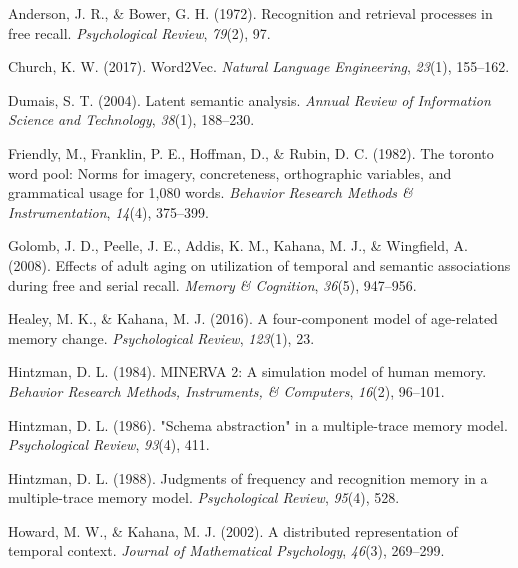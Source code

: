 \documentclass[
  letterpaper,
  DIV=11]{article}
\newlength{\cslhangindent}
\newlength{\cslentryspacingunit} %
\newenvironment{CSLReferences}[2] %
 {%
  \setlength{\parindent}{0pt}
  \ifodd #1
  \let\oldpar\par
  \def\par{\hangindent=\cslhangindent\oldpar}
  \fi
  \setlength{\parskip}{#2\cslentryspacingunit}
 }%
 {}
\begin{document}
\hypertarget{refs}{}
\begin{CSLReferences}{1}{0}
\leavevmode{}%
Anderson, J. R., \& Bower, G. H. (1972). Recognition and retrieval
processes in free recall. \emph{Psychological Review}, \emph{79}(2), 97.

\leavevmode{}%
Church, K. W. (2017). Word2Vec. \emph{Natural Language Engineering},
\emph{23}(1), 155--162.

\leavevmode{}%
Dumais, S. T. (2004). Latent semantic analysis. \emph{Annual Review of
Information Science and Technology}, \emph{38}(1), 188--230.

\leavevmode{}%
Friendly, M., Franklin, P. E., Hoffman, D., \& Rubin, D. C. (1982). The
toronto word pool: Norms for imagery, concreteness, orthographic
variables, and grammatical usage for 1,080 words. \emph{Behavior
Research Methods \& Instrumentation}, \emph{14}(4), 375--399.

\leavevmode{}%
Golomb, J. D., Peelle, J. E., Addis, K. M., Kahana, M. J., \& Wingfield,
A. (2008). Effects of adult aging on utilization of temporal and
semantic associations during free and serial recall. \emph{Memory \&
Cognition}, \emph{36}(5), 947--956.

\leavevmode{}%
Healey, M. K., \& Kahana, M. J. (2016). A four-component model of
age-related memory change. \emph{Psychological Review}, \emph{123}(1),
23.

\leavevmode{}%
Hintzman, D. L. (1984). MINERVA 2: A simulation model of human memory.
\emph{Behavior Research Methods, Instruments, \& Computers},
\emph{16}(2), 96--101.

\leavevmode{}%
Hintzman, D. L. (1986). "Schema abstraction" in a multiple-trace memory
model. \emph{Psychological Review}, \emph{93}(4), 411.

\leavevmode{}%
Hintzman, D. L. (1988). Judgments of frequency and recognition memory in
a multiple-trace memory model. \emph{Psychological Review},
\emph{95}(4), 528.

\leavevmode{}%
Howard, M. W., \& Kahana, M. J. (2002). A distributed representation of
temporal context. \emph{Journal of Mathematical Psychology},
\emph{46}(3), 269--299.


\end{CSLReferences}
\end{document}
